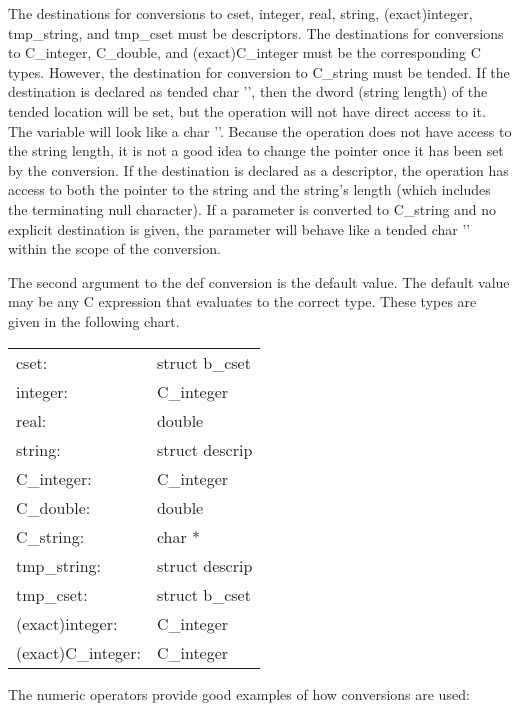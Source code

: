 The destinations for conversions to cset, integer, real, string,
(exact)integer, tmp\_string, and tmp\_cset must be descriptors. The
destinations for conversions to C\_integer, C\_double, and
(exact)C\_integer must be the corresponding C types. However, the
destination for conversion to C\_string must be tended. If the
destination is declared as {\textasciigrave}{\textasciigrave}tended
char '{}', then the dword (string length) of the tended location will
be set, but the operation will not have direct access to it. The
variable will look like a {\textasciigrave}{\textasciigrave}char
'{}'. Because the operation does not have access to the string length,
it is not a good idea to change the pointer once it has been set by
the conversion. If the destination is declared as a descriptor, the
operation has access to both the pointer to the string and the
string's length (which includes the terminating null character). If a
parameter is converted to C\_string and no explicit destination is
given, the parameter will behave like a
{\textasciigrave}{\textasciigrave}tended char '{}' within the scope of
the conversion.

The second argument to the def conversion is the default value. The
default value may be any C expression that evaluates to the correct
type. These types are given in the following chart.

\begin{center}
\tablefirsthead{}
\tablehead{}
\tabletail{}
\tablelasttail{}
\begin{xtabular}{m{0.93025976in}m{0.7538598in}}
 cset:  &
 struct b\_cset \\
 integer:  &
 C\_integer \\
 real:  &
 double \\
 string:  &
 struct descrip \\
 C\_integer:  &
 C\_integer \\
 C\_double:  &
 double \\
 C\_string:  &
 char * \\
 tmp\_string: &
 struct descrip \\
 tmp\_cset:  &
 struct b\_cset \\
 (exact)integer:  &
 C\_integer \\
 (exact)C\_integer:  &
 C\_integer \\
\end{xtabular}
\end{center}

The numeric operators provide good examples of how conversions are used: 

